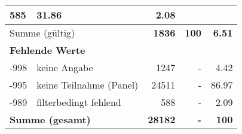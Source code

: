 \begin{longtable}{lXrrr}
       \num{585} &
       \num[round-mode=places,round-precision=2]{31.86} &
         \num[round-mode=places,round-precision=2]{2.08} \\
     \midrule
     \multicolumn{2}{l}{Summe (gültig)} &
       \textbf{\num{1836}} &
     \textbf{100} &
       \textbf{\num[round-mode=places,round-precision=2]{6.51}} \\
     \multicolumn{5}{l}{\textbf{Fehlende Werte}}\\
       -998 &
       keine Angabe &
         \num{1247} &
        - &
         \num[round-mode=places,round-precision=2]{4.42} \\
       -995 &
       keine Teilnahme (Panel) &
         \num{24511} &
        - &
         \num[round-mode=places,round-precision=2]{86.97} \\
       -989 &
       filterbedingt fehlend &
         \num{588} &
        - &
         \num[round-mode=places,round-precision=2]{2.09} \\
     \midrule
     \multicolumn{2}{l}{\textbf{Summe (gesamt)}} &
          \textbf{\num{28182}} &
        \textbf{-} &
        \textbf{100} \\
     \bottomrule
     \end{longtable}
     
